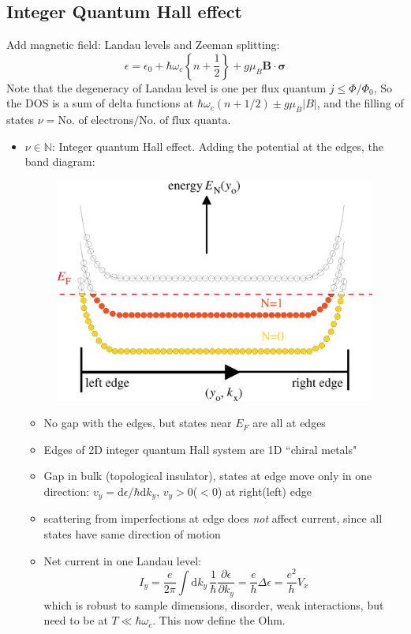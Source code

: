 \documentclass[11pt,letterpaper]{article}
\numberwithin{equation}{section} %
\renewcommand*{\vec}[1]{\bm{#1}}
\newcommand{\dif}{\mathrm d}
\begin{document}
\subsection{Integer Quantum Hall effect}
\label{sub:integer_quantum_hall_effect}
Add magnetic field: Landau levels and Zeeman splitting: 
\begin{equation}\label{eq:e_in_2d}
	\epsilon = \epsilon_0 + \hbar\omega_c \left\{ n+\frac 12 \right\} 
	+ g\mu_B \vec B\cdot\vec\sigma
\end{equation}
Note that the degeneracy of Landau level is one per flux quantum $j\le
\Phi/\Phi_0$, So the DOS is a sum of delta functions at $\hbar\omega_c ( n+
1/2)\pm g\mu_B |B|$, and the filling of states $\nu = \mbox{No. of
electrons}/\mbox{No. of flux quanta}$. 
\begin{itemize}
  \item $\nu\in\mathbb N$: Integer quantum Hall effect. Adding the potential
	  at the edges, the band diagram: 
	  \begin{figure}[htpb]
	    \centering
	    \includegraphics[width=0.6\linewidth]{integral_q_hall.jpg}
	  \end{figure}
	  \begin{itemize}
	    \item No gap with the edges, but states near $E_F$ are all at edges
		\item Edges of 2D integer quantum Hall system are 1D ``chiral metals"
		\item Gap in bulk (topological insulator), states at edge move only
			in one direction: $v_y = \dif\epsilon/\hbar\dif k_y$,
			$v_y>0$($<0$) at right(left) edge
		\item scattering from imperfections at edge does \emph{not} affect
			current, since all states have same direction of motion
		\item Net current in one Landau level: 
			\begin{equation}
				I_y = \frac{e}{2\pi}\int\dif k_y\, \frac 1\hbar
				\frac{\partial\epsilon}{\partial k_y} 
				= \frac eh \Delta \epsilon = \frac{e^2}{h}V_x
			\end{equation}
			which is robust to sample dimensions, disorder, weak
			interactions, but need to be at $T\ll \hbar\omega_c$.
			This now define the Ohm. 
	  \end{itemize}
\end{itemize}
\end{document}
